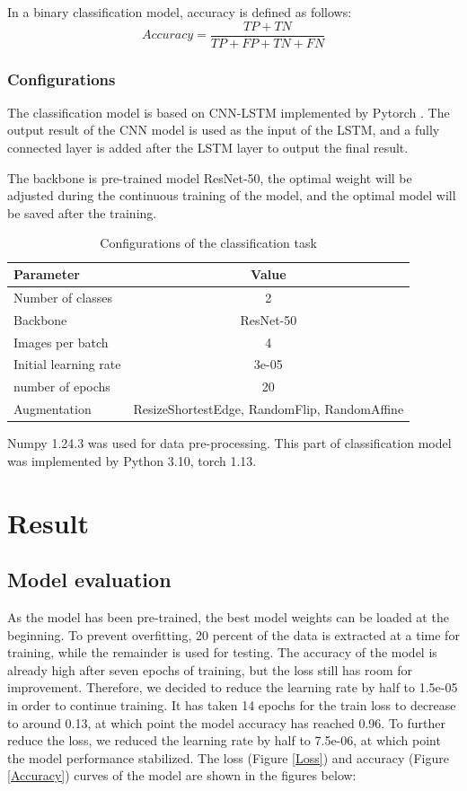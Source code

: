\documentclass[11pt,a4paper]{article}
\begin{document}
\begin{spacing}{1.5}
In a binary classification model, accuracy is defined as follows:
$$
Accuracy = {\frac{TP+TN}{TP+FP+TN+FN}}
$$

\subsubsection{Configurations}
The classification model is based on CNN-LSTM implemented by Pytorch \citep{paszke2019pytorch}. The output result of the CNN model is used as the input of the LSTM, and a fully connected layer is added after the LSTM layer to output the final result.

The backbone is pre-trained model ResNet-50, the optimal weight will be adjusted during the continuous training of the model, and the optimal model will be saved after the training.


\begin{table}[H]
\centering
\caption{Configurations of the classification task}
\begin{tabular}{lc}
\hline
Parameter & Value\\
\hline
Number of classes & 2\\
Backbone & ResNet-50\\
Images per batch & 4\\
Initial learning rate & 3e-05\\
number of epochs & 20\\
Augmentation & ResizeShortestEdge, RandomFlip, RandomAffine\\
\hline
\end{tabular}
\label{tab:classification}
\end{table}

Numpy 1.24.3 was used for data pre-processing. This part of classification model was implemented by Python 3.10, torch 1.13.

\section{Result}

\subsection{Model evaluation}
As the model has been pre-trained, the best model weights can be loaded at the beginning. To prevent overfitting, 20 percent of the data is extracted at a time for training, while the remainder is used for testing. The accuracy of the model is already high after seven epochs of training, but the loss still has room for improvement. Therefore, we decided to reduce the learning rate by half to 1.5e-05 in order to continue training. It has taken 14 epochs for the train loss to decrease to around 0.13, at which point the model accuracy has reached 0.96. To further reduce the loss, we reduced the learning rate by half to 7.5e-06, at which point the model performance stabilized. The loss (Figure \ref{Loss}) and accuracy (Figure \ref{Accuracy}) curves of the model are shown in the figures below:


\end{spacing}
\end{document}

